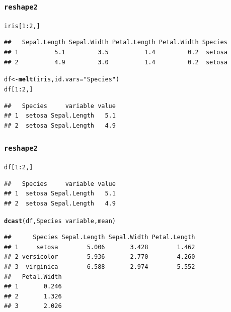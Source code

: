 \documentclass{beamer}\usepackage[]{graphicx}\usepackage[]{color}
\makeatletter
\newcommand{\hlnum}[1]{\textcolor[rgb]{0.686,0.059,0.569}{#1}}%
\newcommand{\hlstr}[1]{\textcolor[rgb]{0.192,0.494,0.8}{#1}}%
\newcommand{\hlopt}[1]{\textcolor[rgb]{0,0,0}{#1}}%
\newcommand{\hlstd}[1]{\textcolor[rgb]{0.345,0.345,0.345}{#1}}%
\newcommand{\hlkwb}[1]{\textcolor[rgb]{0.69,0.353,0.396}{#1}}%
\newcommand{\hlkwc}[1]{\textcolor[rgb]{0.333,0.667,0.333}{#1}}%
\newcommand{\hlkwd}[1]{\textcolor[rgb]{0.737,0.353,0.396}{\textbf{#1}}}%
\newenvironment{kframe}{%
 \def\at@end@of@kframe{}%
 \ifinner\ifhmode%
  \def\at@end@of@kframe{\end{minipage}}%
  \begin{minipage}{\columnwidth}%
 \fi\fi%
 \def\FrameCommand##1{\hskip\@totalleftmargin \hskip-\fboxsep
 \colorbox{shadecolor}{##1}\hskip-\fboxsep
     \hskip-\linewidth \hskip-\@totalleftmargin \hskip\columnwidth}%
 \MakeFramed {\advance\hsize-\width
   \@totalleftmargin\z@ \linewidth\hsize
   \@setminipage}}%
 {\par\unskip\endMakeFramed%
 \at@end@of@kframe}
\newenvironment{knitrout}{}{} %
\makeatother
\begin{document}
\begin{frame}[fragile]
\frametitle{\texttt{reshape2}}
\begin{knitrout}\footnotesize
{}\color{fgcolor}\begin{kframe}
\begin{alltt}
\hlstd{iris[}\hlnum{1}\hlopt{:}\hlnum{2}\hlstd{, ]}
\end{alltt}
\begin{verbatim}
##   Sepal.Length Sepal.Width Petal.Length Petal.Width Species
## 1          5.1         3.5          1.4         0.2  setosa
## 2          4.9         3.0          1.4         0.2  setosa
\end{verbatim}
\begin{alltt}
\hlstd{df}  \hlkwb{<-} \hlkwd{melt}\hlstd{(iris,} \hlkwc{id.vars} \hlstd{=} \hlstr{"Species"}\hlstd{)}
\hlstd{df[}\hlnum{1}\hlopt{:}\hlnum{2}\hlstd{, ]}
\end{alltt}
\begin{verbatim}
##   Species     variable value
## 1  setosa Sepal.Length   5.1
## 2  setosa Sepal.Length   4.9
\end{verbatim}
\end{kframe}
\end{knitrout}
\end{frame}


\begin{frame}[fragile]
\frametitle{\texttt{reshape2}}
\begin{knitrout}\footnotesize
{}\color{fgcolor}\begin{kframe}
\begin{alltt}
\hlstd{df[}\hlnum{1}\hlopt{:}\hlnum{2}\hlstd{, ]}
\end{alltt}
\begin{verbatim}
##   Species     variable value
## 1  setosa Sepal.Length   5.1
## 2  setosa Sepal.Length   4.9
\end{verbatim}
\begin{alltt}
\hlkwd{dcast}\hlstd{(df, Species} \hlopt{~} \hlstd{variable, mean)}
\end{alltt}
\begin{verbatim}
##      Species Sepal.Length Sepal.Width Petal.Length
## 1     setosa        5.006       3.428        1.462
## 2 versicolor        5.936       2.770        4.260
## 3  virginica        6.588       2.974        5.552
##   Petal.Width
## 1       0.246
## 2       1.326
## 3       2.026
\end{verbatim}
\end{kframe}
\end{knitrout}
\end{frame}
\end{document}
